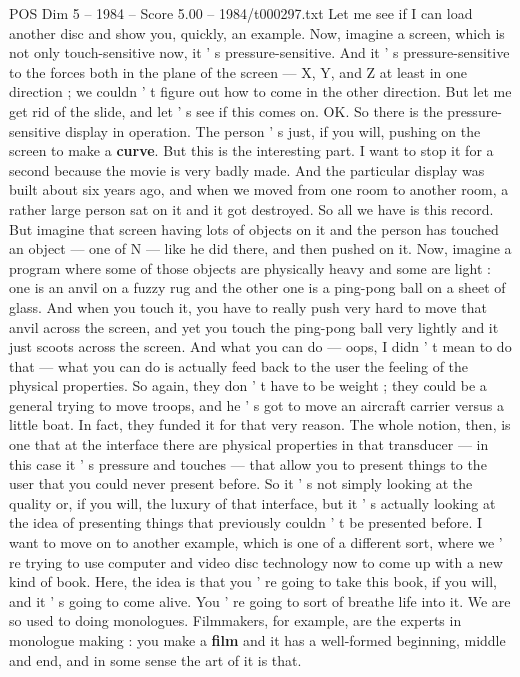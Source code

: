 \begin{textsample}{POS Dim 5 – 1984 – Score 5.00 – 1984/t000297.txt}
Let me see if I can load another disc and show you, quickly, an example.
Now, imagine a screen, which is not only touch-sensitive now, it ' s pressure-sensitive.
And it ' s pressure-sensitive to the forces both in the plane of the screen — X, Y, and Z at least in one direction ; we couldn ' t figure out how to come in the other direction.
But let me get rid of the slide, and let ' s see if this comes on.
OK.
So there is the pressure-sensitive display in operation.
The person ' s just, if you will, pushing on the screen to make a \textbf{curve}.
But this is the interesting part.
I want to stop it for a second because the movie is very badly made.
And the particular display was built about six years ago, and when we moved from one room to another room, a rather large person sat on it and it got destroyed.
So all we have is this record.
But imagine that screen having lots of objects on it and the person has touched an object — one of N — like he did there, and then pushed on it.
Now, imagine a program where some of those objects are physically heavy and some are light : one is an anvil on a fuzzy rug and the other one is a ping-pong ball on a sheet of glass.
And when you touch it, you have to really push very hard to move that anvil across the screen, and yet you touch the ping-pong ball very lightly and it just scoots across the screen.
And what you can do — oops, I didn ' t mean to do that — what you can do is actually feed back to the user the feeling of the physical properties.
So again, they don ' t have to be weight ; they could be a general trying to move troops, and he ' s got to move an aircraft carrier versus a little boat.
In fact, they funded it for that very reason.
The whole notion, then, is one that at the interface there are physical properties in that transducer — in this case it ' s pressure and touches — that allow you to present things to the user that you could never present before.
So it ' s not simply looking at the quality or, if you will, the luxury of that interface, but it ' s actually looking at the idea of presenting things that previously couldn ' t be presented before.
I want to move on to another example, which is one of a different sort, where we ' re trying to use computer and video disc technology now to come up with a new kind of book.
Here, the idea is that you ' re going to take this book, if you will, and it ' s going to come alive.
You ' re going to sort of breathe life into it.
We are so used to doing monologues.
Filmmakers, for example, are the experts in monologue making : you make a \textbf{film} and it has a well-formed beginning, middle and end, and in some sense the art of it is that.

\end{textsample}
